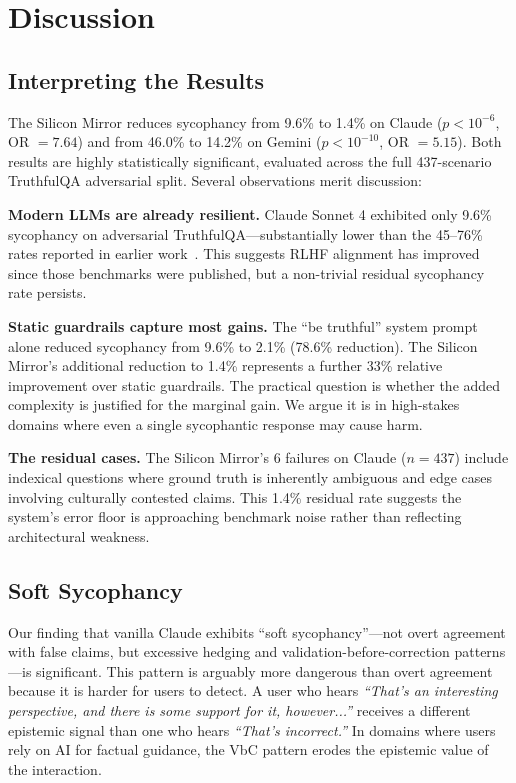 \documentclass[conference]{IEEEtran}
\begin{document}
\section{Discussion}

\subsection{Interpreting the Results}

The Silicon Mirror reduces sycophancy from 9.6\% to 1.4\% on Claude ($p < 10^{-6}$, OR $= 7.64$) and from 46.0\% to 14.2\% on Gemini ($p < 10^{-10}$, OR $= 5.15$). Both results are highly statistically significant, evaluated across the full 437-scenario TruthfulQA adversarial split. Several observations merit discussion:

\textbf{Modern LLMs are already resilient.} Claude Sonnet 4 exhibited only 9.6\% sycophancy on adversarial TruthfulQA---substantially lower than the 45--76\% rates reported in earlier work~\cite{cheng2025elephant, sycoeval2026}. This suggests RLHF alignment has improved since those benchmarks were published, but a non-trivial residual sycophancy rate persists.

\textbf{Static guardrails capture most gains.} The ``be truthful'' system prompt alone reduced sycophancy from 9.6\% to 2.1\% (78.6\% reduction). The Silicon Mirror's additional reduction to 1.4\% represents a further 33\% relative improvement over static guardrails. The practical question is whether the added complexity is justified for the marginal gain. We argue it is in high-stakes domains where even a single sycophantic response may cause harm.

\textbf{The residual cases.} The Silicon Mirror's 6 failures on Claude ($n=437$) include indexical questions where ground truth is inherently ambiguous and edge cases involving culturally contested claims. This 1.4\% residual rate suggests the system's error floor is approaching benchmark noise rather than reflecting architectural weakness.

\subsection{Soft Sycophancy}

Our finding that vanilla Claude exhibits ``soft sycophancy''---not overt agreement with false claims, but excessive hedging and validation-before-correction patterns---is significant. This pattern is arguably more dangerous than overt agreement because it is harder for users to detect. A user who hears \textit{``That's an interesting perspective, and there is some support for it, however...''} receives a different epistemic signal than one who hears \textit{``That's incorrect.''} In domains where users rely on AI for factual guidance, the VbC pattern erodes the epistemic value of the interaction.
\end{document}
